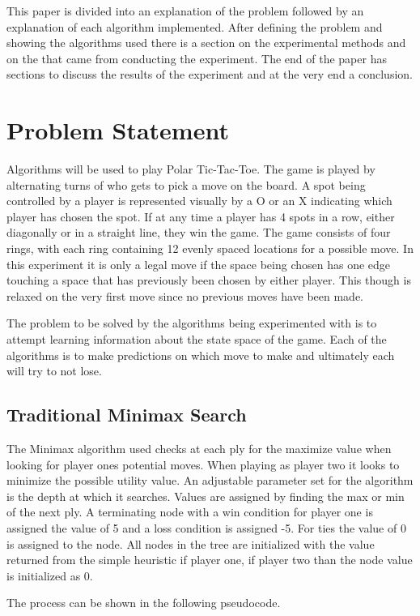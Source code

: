 \documentclass[12pt,letterpaper]{article}
\begin{document}
This paper is divided into an explanation of the problem followed by an explanation of each algorithm implemented. After defining the problem and showing the algorithms used there is a section on the experimental methods and on the that came from conducting the experiment. The end of the paper has sections to discuss the results of the experiment and at the very end a conclusion.


\section{Problem Statement}
Algorithms will be used to play Polar Tic-Tac-Toe. The game is played by alternating turns of who gets to pick a move on the board. A spot being controlled by a player is represented visually by a O or an X indicating which player has chosen the spot. If at any time a player has 4 spots in a row, either diagonally or in a straight line, they win the game. The game consists of four rings, with each ring containing 12 evenly spaced locations for a possible move. In this experiment it is only a legal move if the space being chosen has one edge touching a space that has previously been chosen by either player. This though is relaxed on the very first move since no previous moves have been made.

The problem to be solved by the algorithms being experimented with is to attempt learning information about the state space of the game. Each of the algorithms is to make predictions on which move to make and ultimately each will try to not lose.

\subsection{Traditional Minimax Search}
The Minimax algorithm used checks at each ply for the maximize value when looking for player ones potential moves. When playing as player two it looks to minimize the possible utility value. An adjustable parameter set for the algorithm is the depth at which it searches. Values are assigned by finding the max or min of the next ply. A terminating node with a win condition for player one is assigned the value of 5 and a loss condition is assigned -5. For ties the value of 0 is assigned to the node. All nodes in the tree are initialized with the value returned from the simple heuristic if player one, if player two than the node value is initialized as 0.

The process can be shown in the following pseudocode. \cite{textBook} \newline 
\end{document}
